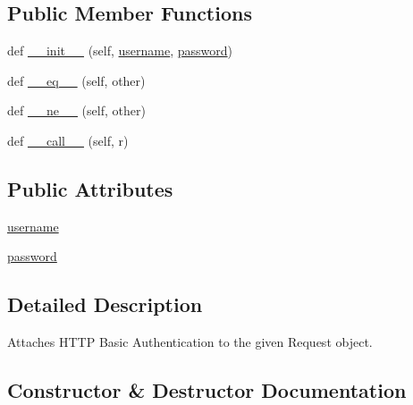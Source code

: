 \subsection*{Public Member Functions}
\begin{DoxyCompactItemize}
\item 
def \hyperlink{classpip_1_1__vendor_1_1requests_1_1auth_1_1HTTPBasicAuth_a2adc72ea3695302789946223074315e4}{\+\_\+\+\_\+init\+\_\+\+\_\+} (self, \hyperlink{classpip_1_1__vendor_1_1requests_1_1auth_1_1HTTPBasicAuth_a1952a1fdb4f4bb246d028a2bde2b867a}{username}, \hyperlink{classpip_1_1__vendor_1_1requests_1_1auth_1_1HTTPBasicAuth_a5a2a030d25a363f03d4409bfd37d072b}{password})
\item 
def \hyperlink{classpip_1_1__vendor_1_1requests_1_1auth_1_1HTTPBasicAuth_a9a4521adc480353dda451c933e99a2fa}{\+\_\+\+\_\+eq\+\_\+\+\_\+} (self, other)
\item 
def \hyperlink{classpip_1_1__vendor_1_1requests_1_1auth_1_1HTTPBasicAuth_adf23082470536dc3a54629bccf49f53e}{\+\_\+\+\_\+ne\+\_\+\+\_\+} (self, other)
\item 
def \hyperlink{classpip_1_1__vendor_1_1requests_1_1auth_1_1HTTPBasicAuth_a682ace21f45c8e7f5ab418da4798e3d7}{\+\_\+\+\_\+call\+\_\+\+\_\+} (self, r)
\end{DoxyCompactItemize}
\subsection*{Public Attributes}
\begin{DoxyCompactItemize}
\item 
\hyperlink{classpip_1_1__vendor_1_1requests_1_1auth_1_1HTTPBasicAuth_a1952a1fdb4f4bb246d028a2bde2b867a}{username}
\item 
\hyperlink{classpip_1_1__vendor_1_1requests_1_1auth_1_1HTTPBasicAuth_a5a2a030d25a363f03d4409bfd37d072b}{password}
\end{DoxyCompactItemize}


\subsection{Detailed Description}
\begin{DoxyVerb}Attaches HTTP Basic Authentication to the given Request object.\end{DoxyVerb}
 

\subsection{Constructor \& Destructor Documentation}
\mbox{\label{classpip_1_1__vendor_1_1requests_1_1auth_1_1HTTPBasicAuth_a2adc72ea3695302789946223074315e4}} 

